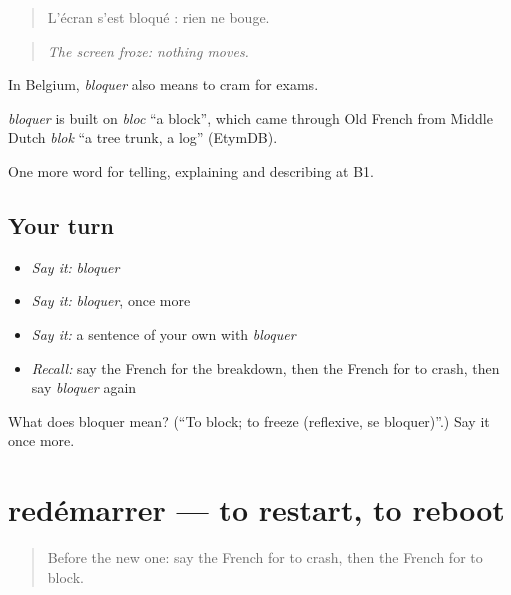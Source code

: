 \begin{quote}
L'écran s'est bloqué : rien ne bouge.
\end{quote}

\begin{quote}
\emph{The screen froze: nothing moves.}
\end{quote}

In Belgium, \emph{bloquer} also means to cram for exams.

\begin{cousinweb}
\emph{bloquer} is built on \emph{bloc} \textquotedblleft{}a block\textquotedblright{}, which came through Old French from Middle Dutch \emph{blok} \textquotedblleft{}a tree trunk, a log\textquotedblright{} (EtymDB).
\end{cousinweb}

\begin{grammarlens}[title={What you've built}]
One more word for telling, explaining and describing at B1.
\end{grammarlens}

\subsection*{Your turn}
\begin{itemize}
\raggedright
  \item \emph{Say it:} \emph{bloquer}
  \item \emph{Say it:} \emph{bloquer}, once more
  \item \emph{Say it:} a sentence of your own with \emph{bloquer}
  \item \emph{Recall:} say the French for the breakdown, then the French for to crash, then say \emph{bloquer} again
\end{itemize}

\begin{tcolorbox}[breakable,colback=teal!4,colframe=teal!35!black,title={Before you move on}]
What does bloquer mean? (\textquotedblleft{}To block; to freeze (reflexive, se bloquer)\textquotedblright{}.) Say it once more.
\end{tcolorbox}
\section[redémarrer]{redémarrer — to restart, to reboot}

\label{lesson:FR-C399-redemarrer}



\begin{quote}
Before the new one: say the French for to crash, then the French for to block.
\end{quote}

